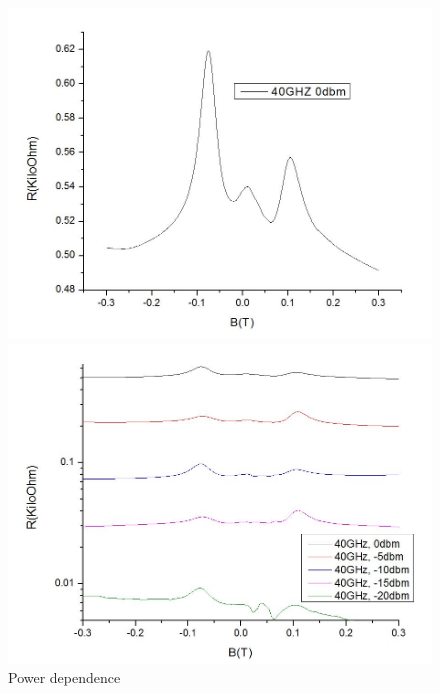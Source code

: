 \documentclass[12pt]{ruthesis}
\begin{document}
\begin{figure}[!htb]\centering
   \begin{minipage}{0.49\textwidth}
     \includegraphics[width=\linewidth]{figures/0dbm.JPG}
     \caption{CR at 0 dbm \SI{40}{\giga \hertz}}\label{0dbm_40ghz}
   \end{minipage}
   \begin {minipage}{0.49\textwidth}
     \includegraphics[width=\linewidth]{figures/thermopowerdep.JPG}
     \caption{Power dependence}\label{thermopowerdep}
   \end{minipage}
\end{figure}
 
\end{document}
